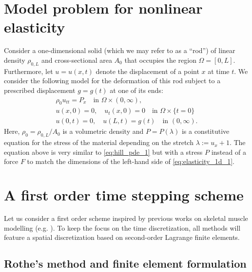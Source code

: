 \documentclass{sfuthesis}
\numberwithin{equation}{section}
\numberwithin{figure}{chapter}
\numberwithin{table}{chapter}
\theoremstyle{definition}
\begin{document}

\section{Model problem for nonlinear elasticity}

Consider a one-dimensional solid (which we may refer to as a ``rod'') of linear density $\rho_{0,L}$ and cross-sectional area $A_0$ that occupies the region $\Omega = [0,L]$. Furthermore, let $u = u(x,t)$ denote the displacement of a point $x$ at time $t$. We consider the following model for the deformation of this rod subject to a prescribed displacement $g = g(t)$ at one of its ends:
\begin{subequations} \label{eq:elasticity_1d}
    \begin{gather}
        \label{eq:elasticity_1d_1}\rho_0 u_{tt} = P_x \quad \text{in }\Omega \times (0,\infty), \\
	    u(x,0) = 0, \quad u_t(x,0) = 0 \quad \text{in } \Omega \times \{t=0\} \\
	    u(0,t) = 0, \quad u(L,t) = g(t) \quad \text{in } (0,\infty).
    \end{gather}
\end{subequations}
Here, $\rho_0 = \rho_{0,L} / A_0$ is a volumetric density and $P = P(\lambda)$ is a constitutive equation for the stress of the material depending on the stretch $\lambda := u_x + 1$. The equation above is very similar to \eqref{eq:hill_pde_1} but with a stress $P$ instead of a force $F$ to match the dimensions of the left-hand side of \eqref{eq:elasticity_1d_1}. 

\section{A first order time stepping scheme} \label{sec:a_firt_order_time_stepping_scheme}

Let us consider a first order scheme inspired by previous works on skeletal muscle modelling (e.g. \cite{Seba,Paper1_WakelingEtAl2020}). To keep the focus on the time discretization, all methods will feature a spatial discretization based on second-order Lagrange finite elements.

\subsection{Rothe's method and finite element formulation} \label{sec:rothe_first_order}
\end{document}
